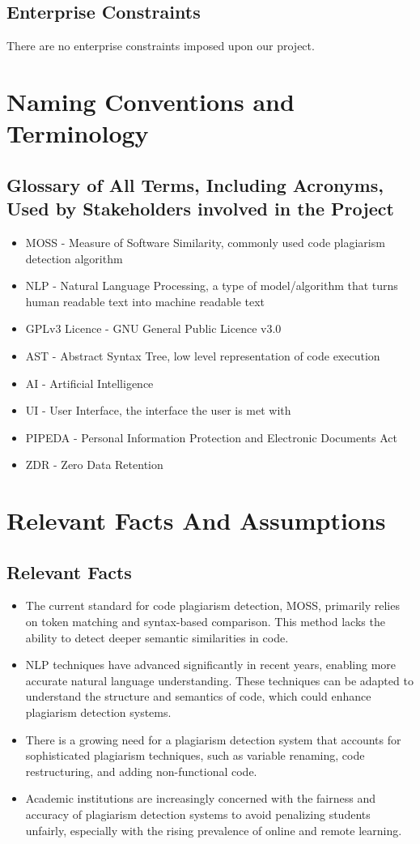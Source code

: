 \documentclass[12pt]{article}
\begin{document}
\subsection{Enterprise Constraints}
There are no enterprise constraints imposed upon our project.

\section{Naming Conventions and Terminology}
\subsection{Glossary of All Terms, Including Acronyms, Used by Stakeholders
involved in the Project}
\begin{itemize}
    \item MOSS - Measure of Software Similarity, commonly used code plagiarism detection algorithm
    \item NLP - Natural Language Processing, a type of model/algorithm that turns human readable text into machine readable text
    \item GPLv3 Licence - GNU General Public Licence v3.0
    \item AST - Abstract Syntax Tree, low level representation of code execution
    \item AI - Artificial Intelligence
    \item UI - User Interface, the interface the user is met with
    \item PIPEDA - Personal Information Protection and Electronic Documents Act
    \item ZDR - Zero Data Retention
\end{itemize}

\section{Relevant Facts And Assumptions}
\subsection{Relevant Facts}
\begin{itemize}
  \item The current standard for code plagiarism detection, MOSS, primarily relies on token matching and syntax-based comparison. This method lacks the ability to detect deeper semantic similarities in code.
  \item NLP techniques have advanced significantly in recent years, enabling more accurate natural language understanding. These techniques can be adapted to understand the structure and semantics of code, which could enhance plagiarism detection systems.
  \item There is a growing need for a plagiarism detection system that accounts for sophisticated plagiarism techniques, such as variable renaming, code restructuring, and adding non-functional code.
  \item Academic institutions are increasingly concerned with the fairness and accuracy of plagiarism detection systems to avoid penalizing students unfairly, especially with the rising prevalence of online and remote learning.
\end{itemize}
\end{document}
